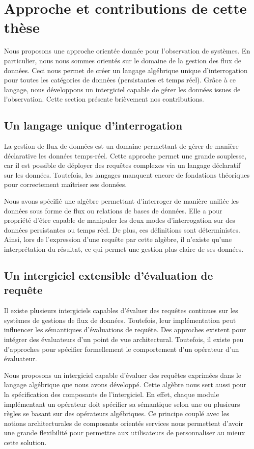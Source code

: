 \section{Approche et contributions de cette thèse}\label{sec:intro:demarche}
Nous proposons une approche orientée donnée pour l'observation de systèmes. En particulier, nous nous sommes orientés sur le domaine de la gestion des flux de données. Ceci nous permet de créer un langage algébrique unique d'interrogation pour toutes les catégories de données (persistantes et temps réel). Grâce à ce langage, nous développons un intergiciel capable de gérer les données issues de l'observation. Cette section présente brièvement nos contributions.

\subsection{Un langage unique d'interrogation}
La gestion de flux de données est un domaine permettant de gérer de manière déclarative les données temps-réel. Cette approche permet une grande souplesse, car il est possible de déployer des requêtes complexes via un langage déclaratif sur les données. Toutefois, les langages manquent encore de fondations théoriques pour correctement maîtriser ses données.

Nous avons spécifié une algèbre permettant d'interroger de manière unifiée les données sous forme de flux ou relations de bases de données. Elle a pour propriété d'être capable de manipuler les deux modes d'interrogation sur des données persistantes ou temps réel. De plus, ces définitions sont déterministes. Ainsi, lors de l'expression d'une requête par cette algèbre, il n'existe qu'une interprétation du résultat, ce qui permet une gestion plus claire de ses données.

\subsection{Un intergiciel extensible d'évaluation de requête}
Il existe plusieurs intergiciels capables d'évaluer des requêtes continues sur les systèmes de gestions de flux de données. Toutefois, leur implémentation peut influencer les sémantiques d'évaluations de requête. Des approches existent pour intégrer des évaluateurs d'un point de vue architectural. Toutefois, il existe peu d'approches pour spécifier formellement le comportement d'un opérateur d'un évaluateur.

Nous proposons un intergiciel capable d'évaluer des requêtes exprimées dans le langage algébrique que nous avons développé. Cette algèbre nous sert aussi pour la spécification des composants de l'intergiciel. En effet, chaque module implémentant un opérateur doit spécifier sa sémantique selon une ou plusieurs règles se basant sur des opérateurs algébriques. Ce principe couplé avec les notions architecturales de composants orientés services nous permettent d'avoir une grande flexibilité pour permettre aux utilisateurs de personnaliser au mieux cette solution.


